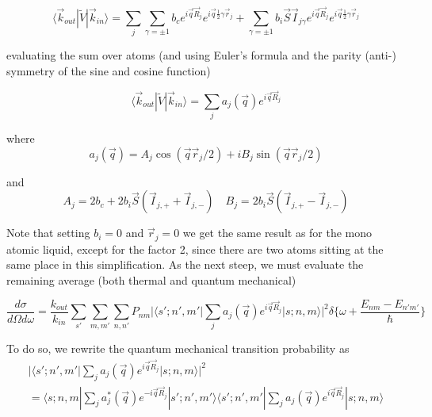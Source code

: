 \documentclass[11pt,a4paper]{article}
\begin{document}
\begin{equation}
\langle \vec k_{out} | \tilde V | \vec k_{in} \rangle = 
\sum_{j} \sum_{\gamma = \pm 1} 
b_c e^{i \vec q \vec R_j} e^{i \vec q \frac{1}{2} \gamma \vec r_j} 
+
\sum_{\gamma = \pm 1} 
b_i \vec S \vec I_{j \gamma} e^{i \vec q \vec R_j} e^{i \vec q \frac{1}{2} \gamma \vec r_j} 
\end{equation}

evaluating the sum over atoms (and using Euler's formula and the parity (anti-) symmetry of the sine and cosine function)

\begin{equation}
\langle \vec k_{out} | \tilde V |\vec k_{in} \rangle = 
\sum_{j} a_j (\vec q) e^{i \vec q \vec R_j} 
\end{equation}

where
\begin{equation}
a_j(\vec q) = A_j \cos ( \vec q \vec r_j/2) + i B_j \sin (\vec q  \vec r_j/2)
\end{equation}

and 
\begin{equation}
A_j = 2 b_c + 2 b_i \vec S ( \vec I_{j, +} + \vec I_{j, -}) \quad
B_j = 2 b_i \vec S (\vec I_{j, +} - \vec I_{j, -} )
\end{equation}

Note that setting $b_i = 0$ and $\vec r_j = 0$ we get the same result as for the mono atomic liquid, except for the factor 2, since there are
two atoms sitting at the same place in this simplification. \newline 
As the next steep, we must evaluate the remaining average (both thermal and quantum mechanical)

\begin{equation}
\frac{d \sigma}{ d \Omega d \omega} =
\frac{k_{out}}{k_{in}}
\sum_{s' }\sum_{m,m'} \sum_{n,n'} P_{nm} | \langle s'; n', m' | \sum_{j} a_j (\vec q) e^{i \vec q \vec R_j}  | s; n, m \rangle |^2
\delta \bigl\{ \omega + \frac{ E_{nm} - E_{n'm'} } {\hbar} \bigr\}
\end{equation}

To do so, we rewrite the quantum mechanical transition probability as
\begin{equation}
\begin{split}
| \langle s'; n', m' | \sum_{j} a_j (\vec q) e^{i \vec q \vec R_j}  | s; n, m \rangle |^2  \\
=
\langle s; n, m  | \sum_{j} a_j^{*} (\vec q) e^{-i \vec q \vec R_j}  | s'; n', m' \rangle 
\langle s'; n', m' | \sum_{j} a_j (\vec q) e^{i \vec q \vec R_j}  | s; n, m \rangle 
\end{split}
\end{equation}
\end{document}
